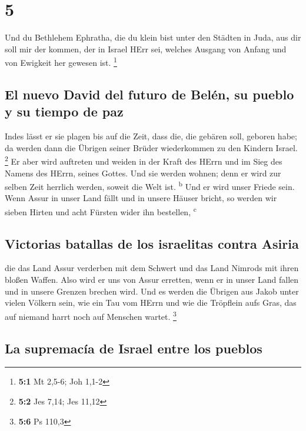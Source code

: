 \hypertarget{section-4}{%
\section{5}\label{section-4}}

 Und du Bethlehem Ephratha, die du klein bist unter den
Städten in Juda, aus dir soll mir der kommen, der in Israel HErr sei,
welches Ausgang von Anfang und von Ewigkeit her gewesen ist. \footnote{\textbf{5:1}
  Mt 2,5-6; Joh 1,1-2}

\hypertarget{el-nuevo-david-del-futuro-de-beluxe9n-su-pueblo-y-su-tiempo-de-paz}{%
\subsection{El nuevo David del futuro de Belén, su pueblo y su tiempo de
paz}\label{el-nuevo-david-del-futuro-de-beluxe9n-su-pueblo-y-su-tiempo-de-paz}}

 Indes lässt er sie plagen bis auf die Zeit, dass die, die
gebären soll, geboren habe; da werden dann die Übrigen seiner Brüder
wiederkommen zu den Kindern Israel. \footnote{\textbf{5:2} Jes 7,14; Jes
  11,12}  Er aber wird auftreten und weiden in der Kraft
des HErrn und im Sieg des Namens des HErrn, seines Gottes. Und sie
werden wohnen; denn er wird zur selben Zeit herrlich werden, soweit die
Welt ist. \textsuperscript{b}  Und er wird unser Friede
sein. Wenn Assur in unser Land fällt und in unsere Häuser bricht, so
werden wir sieben Hirten und acht Fürsten wider ihn bestellen,
\textsuperscript{c}

\hypertarget{victorias-batallas-de-los-israelitas-contra-asiria}{%
\subsection{Victorias batallas de los israelitas contra
Asiria}\label{victorias-batallas-de-los-israelitas-contra-asiria}}

 die das Land Assur verderben mit dem Schwert und das Land
Nimrods mit ihren bloßen Waffen. Also wird er uns von Assur erretten,
wenn er in unser Land fallen und in unsere Grenzen brechen wird.
 Und es werden die Übrigen aus Jakob unter vielen Völkern
sein, wie ein Tau vom HErrn und wie die Tröpflein aufs Gras, das auf
niemand harrt noch auf Menschen wartet. \footnote{\textbf{5:6} Ps 110,3}

\hypertarget{la-supremacuxeda-de-israel-entre-los-pueblos}{%
\subsection{La supremacía de Israel entre los
pueblos}\label{la-supremacuxeda-de-israel-entre-los-pueblos}}

